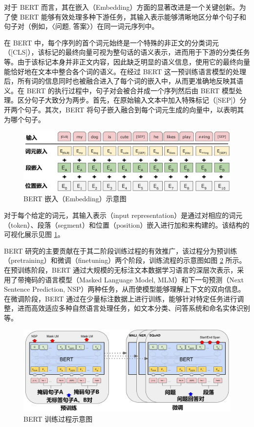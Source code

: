 对于 BERT 而言，其在嵌入（Embedding）方面的显著改进是一个关键创新。为了使 BERT 能够有效处理多种下游任务，其输入表示能够清晰地区分单个句子和句子对（例如，〈问题, 答案〉）在同一词元序列中。

在 BERT 中，每个序列的首个词元始终是一个特殊的非正文的分类词元（[CLS]），该标记的最终向量可视为整句话的语义表示，进而用于下游的分类任务等。由于该标记本身并非正文内容，因此缺乏明显的语义信息，使用它的最终向量能恰好地在文本中整合各个词的语义。在经过 BERT 这一预训练语言模型的处理后，所有词的信息同时也被融合进入了每个词的嵌入中，从而更准确地反映其语义。在 BERT 的执行过程中，句子对会被合并成一个序列然后由 BERT 模型处理。区分句子大致分为两步。首先，在原始输入文本中加入特殊标记（[SEP]）分开两个句子。其次，BERT 将句子嵌入融合到每个词元生成的向量中，以表明其为哪个句子。

\begin{figure}[htb]
	\centering
	\includegraphics[width=0.9\linewidth]{figures/bert_Input_Embeddings.jpg}
	\caption{BERT 嵌入（Embedding）示意图 \cite{devlin_bert_2019}}
	\label{fig:BERT-embedding}
\end{figure}

对于每个给定的词元，其输入表示（input representation）是通过对相应的词元（token）、段落（segment）和位置（position）嵌入进行加和来构建的。该结构的可视化展示见图 \ref{fig:BERT-embedding}。

BERT 研究的主要贡献在于其二阶段训练过程的有效推广，该过程分为预训练（pretraining）和微调（finetuning）两个阶段，训练流程的示意图如图 \ref{fig:BERT-OverAll} 所示。在预训练阶段，BERT 通过大规模的无标注文本数据学习语言的深层次表示，采用了带掩码的语言模型（Masked Language Model, MLM）和下一句预测（Next Sentence Prediction, NSP）两种任务，从而使模型能够理解上下文的双向信息。在微调阶段，BERT 通过在少量标注数据上进行训练，能够针对特定任务进行调整，进而高效适应多种自然语言处理任务，如文本分类、问答系统和命名实体识别等。

\begin{figure}[htb]
	\centering
	\includegraphics[width=0.9\linewidth]{figures/BERT_Overall.jpg}
	\caption{BERT 训练过程示意图 \cite{devlin_bert_2019}}
	\label{fig:BERT-OverAll}
\end{figure}

